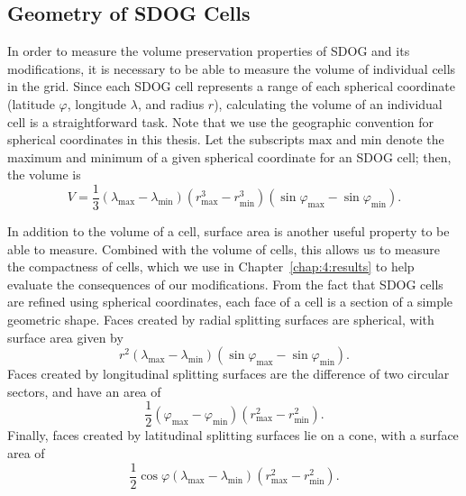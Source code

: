\subsection{Geometry of SDOG Cells} \label{chap:4:geom}
In order to measure the volume preservation properties of SDOG and its modifications, it is necessary to be able to measure the volume of individual cells in the grid.
Since each SDOG cell represents a range of each spherical coordinate (latitude $\varphi$, longitude $\lambda$, and radius $r$), calculating the volume of an individual cell is a straightforward task.
Note that we use the geographic convention for spherical coordinates in this thesis.
Let the subscripts $\mathrm{max}$ and $\mathrm{min}$ denote the maximum and minimum of a given spherical coordinate for an SDOG cell; then, the volume is \cite{yu2009sdog}
%
\begin{equation} \label{eq:volume}
V = \frac{1}{3} \left( \lambda_\mathrm{max} - \lambda_\mathrm{min} \right) \left(r_\mathrm{max}^{3} - r_\mathrm{min}^{3} \right) \left(\sin\varphi_\mathrm{max} - \sin\varphi_\mathrm{min} \right).
\end{equation}


In addition to the volume of a cell, surface area is another useful property to be able to measure.
Combined with the volume of cells, this allows us to measure the compactness of cells, which we use in Chapter~\ref{chap:4:results} to help evaluate the consequences of our modifications.
From the fact that SDOG cells are refined using spherical coordinates, each face of a cell is a section of a simple geometric shape.
Faces created by radial splitting surfaces are spherical, with surface area given by
%
\begin{equation*}
r^2 \left( \lambda_\mathrm{max} - \lambda_\mathrm{min} \right) \left( \sin\varphi_\mathrm{max} - \sin\varphi_\mathrm{min} \right).
\end{equation*}
%
Faces created by longitudinal splitting surfaces are the difference of two circular sectors, and have an area of
%
\begin{equation*}
\frac{1}{2} \left( \varphi_\mathrm{max} - \varphi_\mathrm{min} \right) \left( r_\mathrm{max}^{2} - r_\mathrm{min}^{2} \right).
\end{equation*}
%
Finally, faces created by latitudinal splitting surfaces lie on a cone, with a surface area of
%
\begin{equation*}
\frac{1}{2} \cos\varphi \left( \lambda_\mathrm{max} - \lambda_\mathrm{min} \right) \left( r_\mathrm{max}^{2} - r_\mathrm{min}^{2} \right).
\end{equation*}


